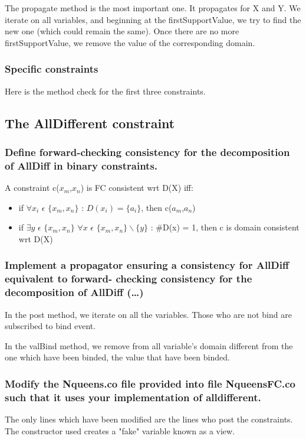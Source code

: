 \documentclass[a4paper ,12pt,french]{article}
\begin{document}
The propagate method is the most important one. It propagates for X and Y. We iterate on all variables, and beginning at the firstSupportValue, we try to find the new one (which could remain the same). Once there are no more firstSupportValue, we remove the value of the corresponding domain.


\subsubsection{Specific constraints}
Here is the method check for the first three constraints.


\subsection{The AllDifferent constraint}
\subsubsection{Define forward-checking consistency for the decomposition of AllDiff in binary constraints.}

A constraint c($x_m$,$x_n$) is FC consistent wrt D(X) iff:
\begin{itemize}
\item if $\forall x_i$ $\epsilon$ $\{x_m,x_n\}$ : $D(x_i) = \{a_i\}$, then c($a_m$,$a_n$) 
\item if $\exists y$ $\epsilon$ $\{x_m,x_n\}$ $\forall x$ $\epsilon$ $\{x_m,x_n\}\backslash\{y\}$ : \#D(x) = 1, then c is domain consistent wrt D(X)
\end{itemize}

\subsubsection{Implement a propagator ensuring a consistency for AllDiff equivalent to forward- checking consistency for the decomposition of AllDiff (\dots)}
In the post method, we iterate on all the variables. Those who are not bind are subscribed to bind event.


In the valBind method, we remove from all variable's domain different from the one which have been binded, the value that have been binded.

\subsubsection{Modify the Nqueens.co file provided into file NqueensFC.co such that it uses your implementation of alldifferent.}
The only lines which have been modified are the lines who post the constraints. The constructor used creates a "fake" variable known as a view.

\end{document}
